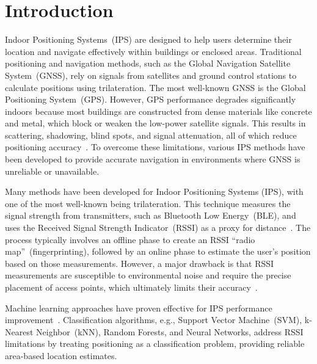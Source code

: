 \documentclass[runningheads]{llncs}
\begin{document}

\section{Introduction}\label{sec:introduction}

Indoor Positioning Systems~(IPS) are designed to help users determine their location and navigate effectively within buildings or enclosed areas. Traditional positioning and navigation methods, such as the Global Navigation Satellite System~(GNSS), rely on signals from satellites and ground control stations to calculate positions using trilateration. The most well-known GNSS is the Global Positioning System~(GPS). However, GPS performance degrades significantly indoors because most buildings are constructed from dense materials like concrete and metal, which block or weaken the low-power satellite signals. This results in scattering, shadowing, blind spots, and signal attenuation, all of which reduce positioning accuracy~\cite{bgp1}. To overcome these limitations, various IPS methods have been developed to provide accurate navigation in environments where GNSS is unreliable or unavailable.

Many methods have been developed for Indoor Positioning Systems (IPS), with one of the most well-known being trilateration. This technique measures the signal strength from transmitters, such as Bluetooth Low Energy~(BLE), and uses the Received Signal Strength Indicator~(RSSI) as a proxy for distance~\cite{bg2}. The process typically involves an offline phase to create an RSSI ``radio map''~(fingerprinting), followed by an online phase to estimate the user's position based on those measurements. However, a major drawback is that RSSI measurements are susceptible to environmental noise and require the precise placement of access points, which ultimately limits their accuracy~\cite{bgp2}.

Machine learning approaches have proven effective for IPS performance improvement~\cite{bgp3}. Classification algorithms, e.g., Support Vector Machine~(SVM), k-Nearest Neighbor~(kNN), Random Forests, and Neural Networks, address RSSI limitations by treating positioning as a classification problem, providing reliable area-based location estimates.
\end{document}
